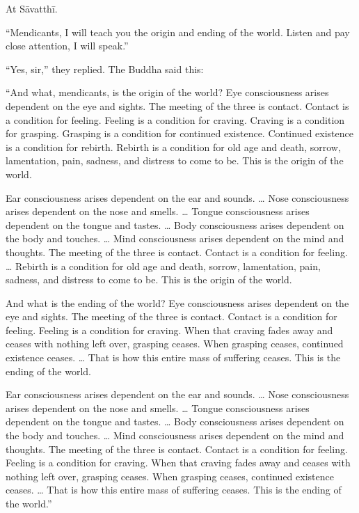 \documentclass[12pt,openany]{book}%
\begin{document}
At \textsanskrit{Sāvatthī}. 

“Mendicants, I will teach you the origin and ending of the world. Listen and pay close attention, I will speak.” 

“Yes, sir,” they replied. The Buddha said this: 

“And what, mendicants, is the origin of the world? Eye consciousness arises dependent on the eye and sights. The meeting of the three is contact. Contact is a condition for feeling. Feeling is a condition for craving. Craving is a condition for grasping. Grasping is a condition for continued existence. Continued existence is a condition for rebirth. Rebirth is a condition for old age and death, sorrow, lamentation, pain, sadness, and distress to come to be. This is the origin of the world. 

Ear consciousness arises dependent on the ear and sounds. … Nose consciousness arises dependent on the nose and smells. … Tongue consciousness arises dependent on the tongue and tastes. … Body consciousness arises dependent on the body and touches. … Mind consciousness arises dependent on the mind and thoughts. The meeting of the three is contact. Contact is a condition for feeling. … Rebirth is a condition for old age and death, sorrow, lamentation, pain, sadness, and distress to come to be. This is the origin of the world. 

And what is the ending of the world? Eye consciousness arises dependent on the eye and sights. The meeting of the three is contact. Contact is a condition for feeling. Feeling is a condition for craving. When that craving fades away and ceases with nothing left over, grasping ceases. When grasping ceases, continued existence ceases. … That is how this entire mass of suffering ceases. This is the ending of the world. 

Ear consciousness arises dependent on the ear and sounds. … Nose consciousness arises dependent on the nose and smells. … Tongue consciousness arises dependent on the tongue and tastes. … Body consciousness arises dependent on the body and touches. … Mind consciousness arises dependent on the mind and thoughts. The meeting of the three is contact. Contact is a condition for feeling. Feeling is a condition for craving. When that craving fades away and ceases with nothing left over, grasping ceases. When grasping ceases, continued existence ceases. … That is how this entire mass of suffering ceases. This is the ending of the world.” 
\end{document}
